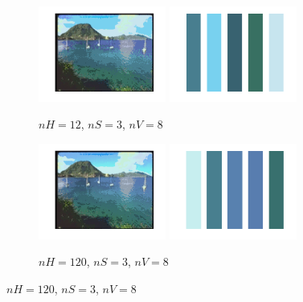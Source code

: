 \documentclass[a4paper]{article}
\begin{document}
\begin{figure}[H]
    \centering

    \begin{subfigure}[c]{0.8\textwidth}
        \centering
        \includegraphics[width=0.46\textwidth]{images/Paysages67_quantifie.png}
        \includegraphics[width=0.46\textwidth]{images/Paysages67_domi.png}
        \caption{$nH = 12$, $nS = 3$, $nV = 8$}
        \label{subfig:Paysages67_original}
    \end{subfigure}

    \begin{subfigure}[c]{0.8\textwidth}
        \centering
        \includegraphics[width=0.46\textwidth]{images/Paysages67_quantifie_nHx10.png}
        \includegraphics[width=0.46\textwidth]{images/Paysages67_domi_nHx10.png}
        \caption{$nH = 120$, $nS = 3$, $nV = 8$}
        \label{subfig:Paysages67_nHx10}
    \end{subfigure}


\end{figure}
\end{document}
